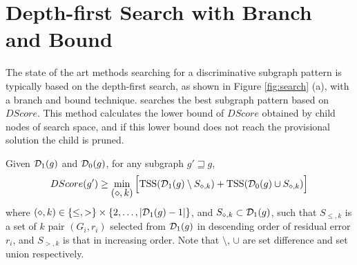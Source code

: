 \section{Depth-first Search with Branch and Bound}
\label{sec:previous}
The state of the art methods \cite{Yan:2008, Saigo:2009, Shirakawa:2018} 
searching for a discriminative subgraph pattern is typically based on the depth-first search, 
as shown in Figure \ref{fig:search} (a), with a branch and bound technique.
\cite{Shirakawa:2018} searches the best subgraph pattern based on $DScore$. 
This method calculates the lower bound of $DScore$ obtained by child nodes of search space, 
and if this lower bound does not reach the provisional solution the child is pruned.
\begin{comment}
\begin{theorem}
  \label{thm:bound_C}
  Given $\D_1(g)$ and $\D_0(g)$, for any subgraph $g' \sqsupseteq g$,
  \begin{multline}
    \label{eq:bound_C}
    CScore(g') \leq 
    \max \Big[ 2 \sum_{\{n | y_n=+1, \{G_{n}, y_{n}\} \in D_1(g)\}} y_n - \sum_{n=1}^{N}y_n, 
	-2 \sum_{\{n | y_n=-1, \{G_{n}, y_{n}\} \in D_1(g)\}} y_n + \sum_{n=1}^{N}y_n \Big]
  \end{multline}
\end{theorem}
\end{comment}

\begin{theorem}
  \label{thm:bound_R}
  Given $\mathcal{D}_1(g)$ and $\mathcal{D}_0(g)$, for any subgraph $g' \sqsupseteq g$,
  \begin{multline}
    \label{eq:bound_R}
    DScore(g') \geq 
    \mymin{(\diamond,k)} \Big[ \tss(\D_1(g) \setminus S_{\diamond, k}) + \tss(\D_0(g) \cup S_{\diamond, k}) \Big]
  \end{multline}
  where $ (\diamond, k) \in \{ \leq, > \} \times \{ 2, \dots, |\mathcal{D}_1(g) - 1| \} $,
  and $S_{\diamond, k} \subset \mathcal{D}_1(g)$, such that $S_{\leq, k}$ is
  a set of $k$ pair $(G_i, r_i)$ selected from $\mathcal{D}_1(g)$ in descending order of residual error $r_i$,
  and $S_{>, k}$ is that in increasing order.
  Note that $\setminus$, $\cup$ are set difference and set union respectively.
\end{theorem}

